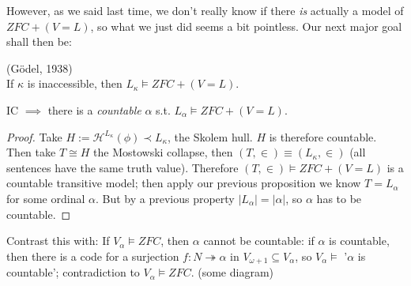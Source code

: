 \documentclass[a4paper]{article}
\begin{document}
However, as we said last time, we don't really know if there \emph{is} actually a model of $ZFC+(V=L)$, so what we just did seems a bit pointless. Our next major goal shall then be:

\begin{thm} (G\"{o}del, 1938)\\
If $\kappa$ is inaccessible, then $L_\kappa \vDash ZFC+(V=L)$.
\end{thm}

\begin{coro}
IC $\implies$ there is a \emph{countable} $\alpha$ s.t. $L_\alpha \vDash ZFC+(V=L)$.
\begin{proof}
Take $H:=\mathcal{H}^{L_\kappa}(\phi) \prec L_\kappa$, the Skolem hull. $H$ is therefore countable. Then take $T \cong H$ the Mostowski collapse, then $(T,\in) \equiv (L_\kappa,\in)$ (all sentences have the same truth value). Therefore $(T,\in) \vDash ZFC+(V=L)$ is a countable transitive model; then apply our previous proposition we know $T=L_\alpha$ for some ordinal $\alpha$. But by a previous property $|L_\alpha| = |\alpha|$, so $\alpha$ has to be countable.
\end{proof}
\end{coro}

Contrast this with: If $V_\alpha \vDash ZFC$, then $\alpha$ cannot be countable: if $\alpha$ is countable, then there is a code for a surjection $f:N \twoheadrightarrow \alpha$ in $V_{\omega+1} \subseteq V_\alpha$, so $V_\alpha \vDash$ '$\alpha$ is countable'; contradiction to $V_\alpha \vDash ZFC$. (some diagram)
\end{document}
